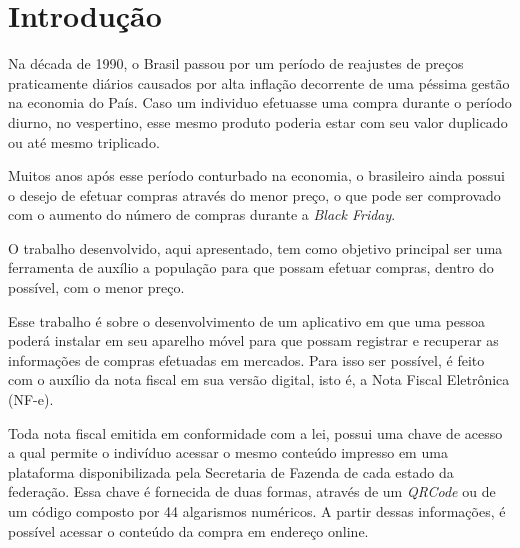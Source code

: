 \chapter{Introdução}


Na década de 1990, o Brasil passou por um período de reajustes de preços praticamente diários causados por alta inflação decorrente de uma péssima gestão na economia do País. Caso um individuo efetuasse uma compra durante o período diurno, no vespertino, esse mesmo produto poderia estar com seu valor duplicado ou até mesmo triplicado.

Muitos anos após esse período conturbado na economia, o brasileiro ainda possui o desejo de efetuar compras através do menor preço, o que pode ser comprovado com o aumento do número de compras durante a \textit{Black Friday}.


O trabalho desenvolvido, aqui apresentado, tem como objetivo principal ser uma ferramenta de auxílio a população para que possam efetuar compras, dentro do possível, com o menor preço.


Esse trabalho é sobre o desenvolvimento de um aplicativo em que uma pessoa poderá instalar em seu aparelho móvel para que possam registrar e recuperar as informações de compras efetuadas em mercados. Para isso ser possível, é feito com o auxílio da nota fiscal em sua versão digital, isto é, a Nota Fiscal Eletrônica (NF-e).

Toda nota fiscal emitida em conformidade com a lei, possui uma chave de acesso a qual permite o indivíduo acessar o mesmo conteúdo impresso em uma plataforma disponibilizada pela Secretaria de Fazenda de cada estado da federação. Essa chave é fornecida de duas formas, através de um \textit{QRCode} ou de um código composto por 44 algarismos numéricos. A partir dessas informações, é possível acessar o conteúdo da compra em endereço online.

